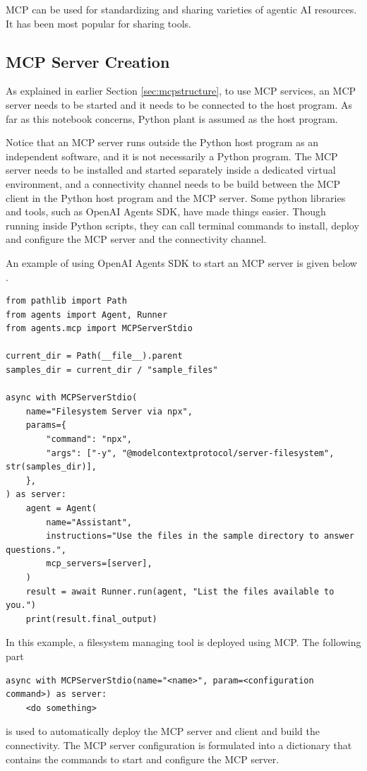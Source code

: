 MCP can be used for standardizing and sharing varieties of agentic AI resources. It has been most popular for sharing tools.

\subsection{MCP Server Creation}

As explained in earlier Section \ref{sec:mcpstructure}, to use MCP services, an MCP server needs to be started and it needs to be connected to the host program. As far as this notebook concerns, Python plant is assumed as the host program.

Notice that an MCP server runs outside the Python host program as an independent software, and it is not necessarily a Python program. The MCP server needs to be installed and started separately inside a dedicated virtual environment, and a connectivity channel needs to be build between the MCP client in the Python host program and the MCP server. Some python libraries and tools, such as OpenAI Agents SDK, have made things easier. Though running inside Python scripts, they can call terminal commands to install, deploy and configure the MCP server and the connectivity channel.

An example of using OpenAI Agents SDK to start an MCP server is given below \cite{openai2025mcp}.

\begin{lstlisting}
from pathlib import Path
from agents import Agent, Runner
from agents.mcp import MCPServerStdio

current_dir = Path(__file__).parent
samples_dir = current_dir / "sample_files"

async with MCPServerStdio(
	name="Filesystem Server via npx",
	params={
		"command": "npx",
		"args": ["-y", "@modelcontextprotocol/server-filesystem", str(samples_dir)],
	},
) as server:
	agent = Agent(
		name="Assistant",
		instructions="Use the files in the sample directory to answer questions.",
		mcp_servers=[server],
	)
	result = await Runner.run(agent, "List the files available to you.")
	print(result.final_output)
\end{lstlisting}

In this example, a filesystem managing tool is deployed using MCP. The following part
\begin{lstlisting}
async with MCPServerStdio(name="<name>", param=<configuration command>) as server:
	<do something>
\end{lstlisting}
is used to automatically deploy the MCP server and client and build the connectivity. The MCP server configuration is formulated into a dictionary that contains the commands to start and configure the MCP server.

